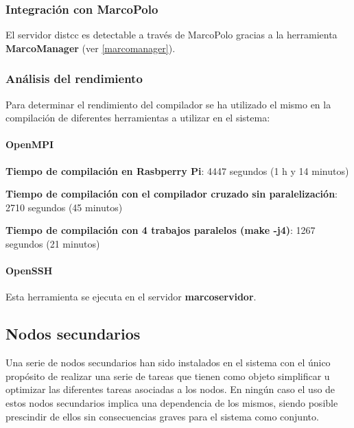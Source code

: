 \subsubsection{Integración con MarcoPolo}

El servidor distcc es detectable a través de MarcoPolo gracias a la herramienta \textbf{MarcoManager} (ver \ref{marcomanager}).

\subsubsection{Análisis del rendimiento\\}
\label{distcc:performance}

Para determinar el rendimiento del compilador se ha utilizado el mismo en la compilación de diferentes herramientas a utilizar en el sistema:

\paragraph{OpenMPI\\}

\textbf{Tiempo de compilación en Rasbperry Pi}: 4447 segundos (1 h y 14 minutos)

\textbf{Tiempo de compilación con el compilador cruzado sin paralelización}: 2710 segundos (45 minutos)

\textbf{Tiempo de compilación con 4 trabajos paralelos (make -j4)}: 1267 segundos (21 minutos)


\paragraph{OpenSSH\\}
\citationneeded[TODO]
Esta herramienta se ejecuta en el servidor \textbf{marcoservidor}.

\subsection{Nodos secundarios}

Una serie de nodos secundarios han sido instalados en el sistema con el único propósito de realizar una serie de tareas que tienen como objeto simplificar u optimizar las diferentes tareas asociadas a los nodos. En ningún caso el uso de estos nodos secundarios implica una dependencia de los mismos, siendo posible prescindir de ellos sin consecuencias graves para el sistema como conjunto.

